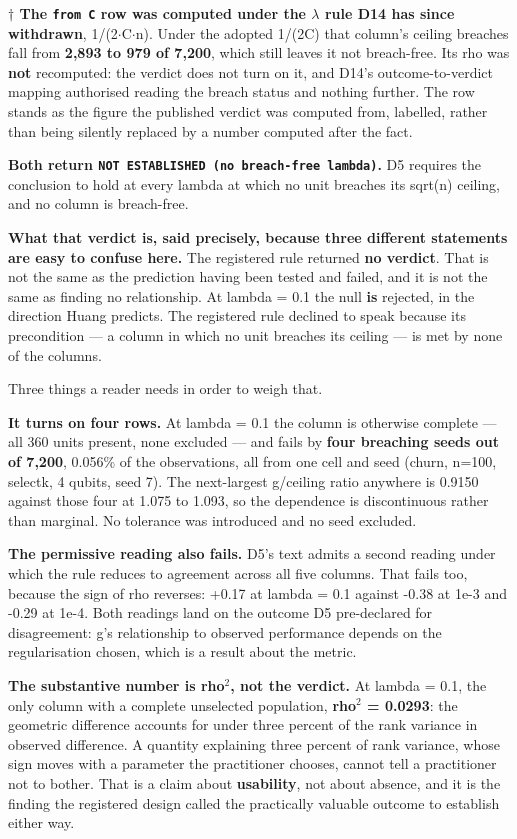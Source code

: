 \documentclass[
  10pt,
]{article}
\newcounter{none} %
\begin{document}
\textbf{\(\dagger\) The \texttt{from\ C} row was computed under the
\(\lambda\) rule D14 has since withdrawn}, 1/(2\(\cdot\)C\(\cdot\)n).
Under the adopted 1/(2C) that column's ceiling breaches fall from
\textbf{2,893 to 979 of 7,200}, which still leaves it not breach-free.
Its rho was \textbf{not} recomputed: the verdict does not turn on it,
and D14's outcome-to-verdict mapping authorised reading the breach
status and nothing further. The row stands as the figure the published
verdict was computed from, labelled, rather than being silently replaced
by a number computed after the fact.

\textbf{Both return
\texttt{NOT\ ESTABLISHED\ (no\ breach-free\ lambda)}.} D5 requires the
conclusion to hold at every lambda at which no unit breaches its sqrt(n)
ceiling, and no column is breach-free.

\textbf{What that verdict is, said precisely, because three different
statements are easy to confuse here.} The registered rule returned
\textbf{no verdict}. That is not the same as the prediction having been
tested and failed, and it is not the same as finding no relationship. At
lambda = 0.1 the null \textbf{is} rejected, in the direction Huang
predicts. The registered rule declined to speak because its precondition
--- a column in which no unit breaches its ceiling --- is met by none of
the columns.

Three things a reader needs in order to weigh that.

\textbf{It turns on four rows.} At lambda = 0.1 the column is otherwise
complete --- all 360 units present, none excluded --- and fails by
\textbf{four breaching seeds out of 7,200}, 0.056\% of the observations,
all from one cell and seed (churn, n=100, selectk, 4 qubits, seed 7).
The next-largest g/ceiling ratio anywhere is 0.9150 against those four
at 1.075 to 1.093, so the dependence is discontinuous rather than
marginal. No tolerance was introduced and no seed excluded.

\textbf{The permissive reading also fails.} D5's text admits a second
reading under which the rule reduces to agreement across all five
columns. That fails too, because the sign of rho reverses: +0.17 at
lambda = 0.1 against -0.38 at 1e-3 and -0.29 at 1e-4. Both readings land
on the outcome D5 pre-declared for disagreement: g's relationship to
observed performance depends on the regularisation chosen, which is a
result about the metric.

\textbf{The substantive number is rho\(^{2}\), not the verdict.} At
lambda = 0.1, the only column with a complete unselected population,
\textbf{rho\(^{2}\) = 0.0293}: the geometric difference accounts for
under three percent of the rank variance in observed difference. A
quantity explaining three percent of rank variance, whose sign moves
with a parameter the practitioner chooses, cannot tell a practitioner
not to bother. That is a claim about \textbf{usability}, not about
absence, and it is the finding the registered design called the
practically valuable outcome to establish either way.
\end{document}
